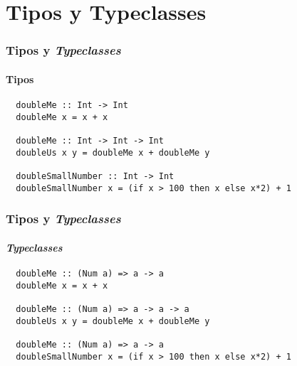 \section{Tipos y Typeclasses}
\begin{frame}[fragile]
  \frametitle{Tipos y \emph{Typeclasses}}
  \framesubtitle{Tipos}
  {\color{white}
    \begin{verbatim}
  doubleMe :: Int -> Int
  doubleMe x = x + x

  doubleMe :: Int -> Int -> Int
  doubleUs x y = doubleMe x + doubleMe y

  doubleSmallNumber :: Int -> Int
  doubleSmallNumber x = (if x > 100 then x else x*2) + 1
    \end{verbatim}
  }
\end{frame}

\begin{frame}[fragile]
  \frametitle{Tipos y \emph{Typeclasses}}
  \framesubtitle{\emph{Typeclasses}}
  {\color{white}
    \begin{verbatim}
  doubleMe :: (Num a) => a -> a
  doubleMe x = x + x

  doubleMe :: (Num a) => a -> a -> a
  doubleUs x y = doubleMe x + doubleMe y

  doubleMe :: (Num a) => a -> a
  doubleSmallNumber x = (if x > 100 then x else x*2) + 1
    \end{verbatim}
  }
\end{frame}